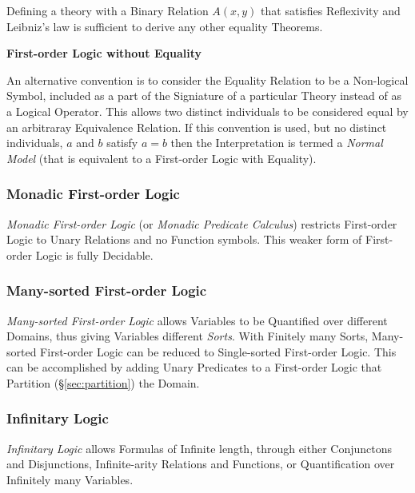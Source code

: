 Defining a theory with a Binary Relation $A(x,y)$ that satisfies
Reflexivity and Leibniz's law is sufficient to derive any other
equality Theorems.



\textbf{First-order Logic without Equality}

An alternative convention is to consider the Equality Relation to be a
Non-logical Symbol, included as a part of the Signiature of a
particular Theory instead of as a Logical Operator. This allows two
distinct individuals to be considered equal by an arbitraray
Equivalence Relation. If this convention is used, but no distinct
individuals, $a$ and $b$ satisfy $a=b$ then the Interpretation is
termed a \emph{Normal Model} (that is equivalent to a First-order
Logic with Equality).



\subsubsection{Monadic First-order Logic}\label{sec:monadic_firstorder}

\emph{Monadic First-order Logic} (or \emph{Monadic Predicate
  Calculus}) restricts First-order Logic to Unary Relations and no
Function symbols. This weaker form of First-order Logic is fully
Decidable.



\subsubsection{Many-sorted First-order Logic}\label{sec:many_sorted_logic}

\emph{Many-sorted First-order Logic} allows Variables to be Quantified
over different Domains, thus giving Variables different \emph{Sorts}.
With Finitely many Sorts, Many-sorted First-order Logic can be reduced
to Single-sorted First-order Logic. This can be accomplished by adding
Unary Predicates to a First-order Logic that Partition
(\S\ref{sec:partition}) the Domain.



\subsubsection{Infinitary Logic}\label{sec:infinitary_logic}

\emph{Infinitary Logic} allows Formulas of Infinite length, through
either Conjunctons and Disjunctions, Infinite-arity Relations and
Functions, or Quantification over Infinitely many Variables.



